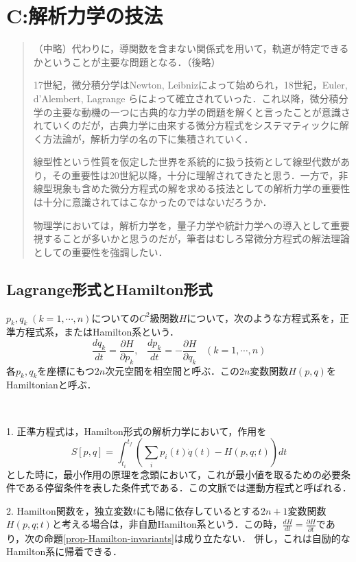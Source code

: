 \documentclass[uplatex,dvipdfmx]{jsreport}
\begin{document}
\chapter{C:解析力学の技法}

\begin{quotation}
    （中略）代わりに，導関数を含まない関係式を用いて，軌道が特定できるかということが主要な問題となる．（後略）

    17世紀，微分積分学はNewton, Leibnizによって始められ，18世紀，Euler, d'Alembert, Lagrange らによって確立されていった．これ以降，微分積分学の主要な動機の一つに古典的な力学の問題を解くと言ったことが意識されていくのだが，古典力学に由来する微分方程式をシステマティックに解く方法論が，解析力学の名の下に集積されていく．

    線型性という性質を仮定した世界を系統的に扱う技術として線型代数があり，その重要性は20世紀以降，十分に理解されてきたと思う．一方で，非線型現象も含めた微分方程式の解を求める技法としての解析力学の重要性は十分に意識されてはこなかったのではないだろうか．

    物理学においては，解析力学を，量子力学や統計力学への導入として重要視することが多いかと思うのだが，筆者はむしろ常微分方程式の解法理論としての重要性を強調したい．
\end{quotation}

\section{Lagrange形式とHamilton形式}

\begin{definition}
    $p_k,q_k\;(k=1,\cdots,n)$についての$C^2$級関数$H$について，次のような方程式系を，正準方程式系，またはHamilton系という．
    \[ \frac{dq_k}{dt}=\frac{\partial H}{\partial p_k},\;\;\;\frac{dp_k}{dt}=-\frac{\partial H}{\partial q_k}\;\;\; (k=1,\cdots,n) \]
    各$p_k,q_k$を座標にもつ$2n$次元空間を相空間と呼ぶ．この$2n$変数関数$H(p,q)$をHamiltonianと呼ぶ．
\end{definition}
\begin{remark}　

    1. 正準方程式は，Hamilton形式の解析力学において，作用を
    \[ S[p,q]=\int^{t_f}_{t_i}\left( \sum_ip_i(t)\dot{q}(t)-H(p,q;t) \right)dt \]
    とした時に，最小作用の原理を念頭において，これが最小値を取るための必要条件である停留条件を表した条件式である．この文脈では運動方程式と呼ばれる．

    2. Hamilton関数を，独立変数$t$にも陽に依存しているとする$2n+1$変数関数$H(p,q;t)$と考える場合は，非自励Hamilton系という．この時，$\frac{dH}{dt}=\frac{\partial H}{\partial t}$であり，次の命題\ref{prop-Hamilton-invariants}は成り立たない．
    併し，これは自励的なHamilton系に帰着できる．
\end{remark}
\end{document}
